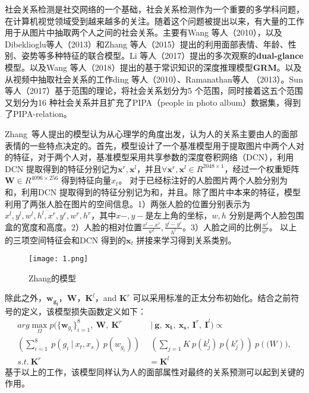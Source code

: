 社会关系检测是社交网络的一个基础\cite{li2015celebritynet}，社会关系检测作为一个重要的多学科问题，在计算机视觉领域受到越来越多的关注。随着这个问题被提出以来，有大量的工作用于从图片中抽取两个人之间的社会关系。主要有Wang 等人（2010）\cite{wang2010seeing}，以及Dibeklioglu等人（2013）\cite{dibeklioglu2013like}和Zhang 等人（2015）\cite{zhang2015learning}提出的利用面部表情、年龄、性别、姿势等多种特征的联合模型。Li 等人（2017）\cite{li2017dual-glance}提出的多次观察的\textbf{dual-glance}模型。以及Wang 等人（2018）\cite{wang2018deep}提出的基于常识知识的深度推理模型\textbf{GRM}。以及从视频中抽取社会关系的工作ding 等人（2010）\cite{ding2010learning}、Ramanathan等人 （2013）\cite{ramanathan2013social}。Sun等人（2017）\cite{sun2017a}基于范围的理论，将社会关系划分为5 个范围，同时接着这五个范围又划分为16 种社会关系并且扩充了PIPA（people in photo album）数据集\cite{zhang2015beyond}，得到了PIPA-relation。

Zhang~等人\cite{zhang2015learning}提出的模型认为从心理学的角度出发，认为人的关系主要由人的面部表情的一些特点决定的。首先，模型设计了一个基准模型用于提取图片中两个人对的特征，对于两个人对，基准模型采用共享参数的深度卷积网络（DCN），利用DCN 提取得到的特征分别记为$\mathbf{x}^r,\mathbf{x}^l$，并且$\forall \mathbf{x}^r,\mathbf{x}^l \in R^{2048 \times 1}$，经过一个权重矩阵$\mathbf{W} \in R^{4096 \times 256}$ 得到特征向量$x_t$。 对于已经标注好的人脸图片两个人脸分别为和，利用DCN 提取得到的特征分别记为和，并且。除了图片中本来的特征，模型利用了两张人脸在图片的空间信息。1）两张人脸的位置分别表示为${x^l,y^l,w^l,h^l,x^r,y^r,w^r,h^r}$，其中$x-,y-$是左上角的坐标，$w,h$ 分别是两个人脸包围盒的宽度和高度。2）人脸的相对位置$\frac{x^l-x^r}{w^l},\frac{y^l-y^r}{h^l}$。3）人脸之间的比例$\frac{w^l}{w^r}$。 以上的三项空间特征会和DCN 得到的$\mathbf{x}_t$ 拼接来学习得到关系类别。
\begin{figure}[htpb]
	\centering
	\texttt{[image: 1.png]}
    \caption{Zhang的模型}
	\vspace*{-3.5mm}
	\label{fig:model_zhang}
\end{figure}
除此之外，$\mathbf{w_{g_{i}}}$，$\mathbf{W}$，$\mathbf{K}^l$，and $\mathbf{K}^r$ 可以采用标准的正太分布初始化。结合之前符号的定义，该模型损失函数定义如下：
\begin{equation}
\begin{split}
     arg\max \limits_{\Omega} p(\{\mathbf{w}_{g_{i}}\}_{i=1}^8, ~\mathbf{W}, ~\mathbf{K}^r & ~|~ \mathbf{g},~\mathbf{x_t},~\mathbf{x_s},~\mathbf{I}^r,~\mathbf{I}^l) \propto \\
     (\sum_{i=1}^{8}~p(g_i~|~x_t,x_s)~p(w_{g_i}))~ & ~(\sum_{j=1}{K}~p(k_j^l)~p(k_j^r))~p(\mathbf(W)), \\
     s.t. ~\mathbf{K}^r &= \mathbf{K}^l
\end{split}
\end{equation}
基于以上的工作，该模型同样认为人的面部属性对最终的关系预测可以起到关键的作用。

